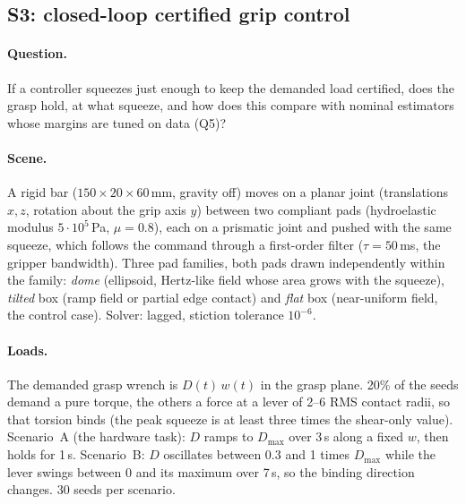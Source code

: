 \documentclass[11pt,a4paper]{article}
\begin{document}
\subsection{S3: closed-loop certified grip control}
\label{sec:S3}
\paragraph{Question.} If a controller squeezes just enough to keep the demanded load certified, does the grasp hold, at what squeeze, and how does
this compare with nominal estimators whose margins are tuned on data (Q5)?

\paragraph{Scene.} A rigid bar ($150\times20\times60$\,mm, gravity off) moves on a planar joint (translations $x,z$, rotation about the grip axis $y$)
between two compliant pads (hydroelastic modulus $5\cdot10^5$\,Pa, $\mu=0.8$), each on a prismatic joint and pushed with the same squeeze, which
follows the command through a first-order filter ($\tau=50$\,ms, the gripper bandwidth). Three pad families, both pads drawn independently within
the family: \emph{dome} (ellipsoid, Hertz-like field whose area grows with the squeeze), \emph{tilted} box (ramp field or partial edge contact) and
\emph{flat} box (near-uniform field, the control case). Solver: lagged, stiction tolerance $10^{-6}$.

\paragraph{Loads.} The demanded grasp wrench is $D(t)\,w(t)$ in the grasp plane. 20\% of the seeds demand a pure torque, the others a force at a
lever of 2--6 RMS contact radii, so that torsion binds (the peak squeeze is at least three times the shear-only value). Scenario~A (the
hardware task): $D$ ramps to $D_{\max}$ over 3\,s along a fixed $w$, then holds for 1\,s. Scenario~B: $D$ oscillates between 0.3 and 1 times
$D_{\max}$ while the lever swings between 0 and its maximum over 7\,s, so the binding direction changes. 30 seeds per scenario.
\end{document}
